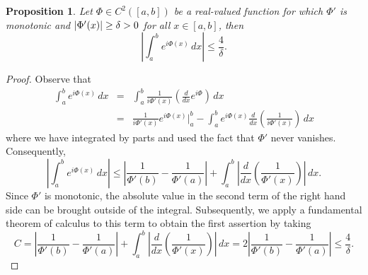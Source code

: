 \documentclass[11pt, letter]{book}
\newtheorem{proposition}[theorem]{Proposition}
\newcommand{\lp}{\left(}
\newcommand{\rp}{\right)}
\newcommand{\f}[2]{\frac{#1}{#2}}
\begin{document}
\begin{framed}
\begin{proposition}\label{prop:NoCriticalPoint}
Let $\Phi\in C^2([a,b])$ be a real-valued function for which $\Phi'$ is monotonic and $\abs{\Phi'(x)} \geq \delta > 0$ for all $x\in [a,b]$, then 
\begin{equation*}
    \left|\int_a^b e^{i\Phi(x)}\,dx\right|\leq \frac{4}{\delta}.
\end{equation*}
\end{proposition}
\end{framed}
\begin{proof}
Observe that
\begin{eqnarray*}
    \int_{a}^b e^{i \Phi(x)}\,dx  
    &=& \int_{a}^b   \f{1}{i \Phi'(x)}\lp \f{d}{dx}e^{i \Phi}\rp   \,dx \\
    &=& \f{1}{i \Phi'(x)}e^{i \Phi(x)}\bigg\vert_{a}^b 
    - \int_{a}^b  e^{i \Phi(x)} \f{d}{dx}\lp \f{1}{i \Phi'(x)} \rp \,dx 
\end{eqnarray*}
where we have integrated by parts and used the fact that $\Phi'$ never vanishes. Consequently,
\begin{equation*}
    \left|\int_a^b e^{i\Phi(x)}\,dx\right|\leq \left|\frac{1}{\Phi'(b)}-\frac{1}{\Phi'(a)}\right|+\int_a^b\left|\frac{d}{dx}\left(\frac{1}{\Phi'(x)}\right)\right|\,dx.
\end{equation*}
Since $\Phi'$ is monotonic, the absolute value in the second term of the right hand side can be brought outside of the integral. Subsequently, we apply a fundamental theorem of calculus to this term to obtain the first assertion by taking
\begin{equation*}
 C=\left|\frac{1}{\Phi'(b)}-\frac{1}{\Phi'(a)}\right|+\int_a^b\left|\frac{d}{dx}\left(\frac{1}{\Phi'(x)}\right)\right|\,dx=2\left|\frac{1}{\Phi'(b)}-\frac{1}{\Phi'(a)}\right|\leq\frac{4}{\delta}.
\end{equation*}
\end{proof}
\end{document}
